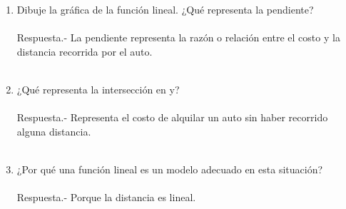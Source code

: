 \begin{enumerate}
\begin{enumerate}[\bfseries (a)]
	\item Dibuje la gráfica de la función lineal. ¿Qué representa la pendiente?\\\\
	    Respuesta.-\; La pendiente representa la razón o relación entre el costo y la distancia recorrida por el auto.\\\\

	\item ¿Qué representa la intersección en y?\\\\
	    Respuesta.-\; Representa el costo de alquilar un auto sin haber recorrido alguna distancia.\\\\

	\item ¿Por qué una función lineal es un modelo adecuado en esta situación?\\\\
	    Respuesta.-\; Porque la distancia es lineal.\\\\

    \end{enumerate}

\end{enumerate}
